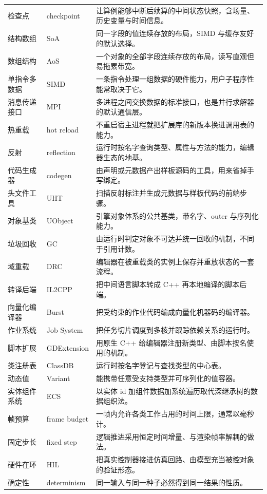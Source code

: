 \documentclass[12pt,a4paper,fontset=fandol]{ctexbook}
\newcommand{\Lang}[1]{\textsf{#1}}
\newcommand{\CPP}{\Lang{C++}}
\begin{document}
\begin{longtable}{>{\raggedright\arraybackslash}p{}>{\raggedright\arraybackslash}p{}>{\raggedright\arraybackslash}p{}}
检查点 & checkpoint & 让算例能够中断后续算的中间状态快照，含场量、历史变量与时间信息。 \\
结构数组 & SoA & 同一字段的值连续存放的布局，SIMD 与缓存友好的默认选择。 \\
数组结构 & AoS & 一个对象的全部字段连续存放的布局，读写直观但易拖累带宽。 \\
单指令多数据 & SIMD & 一条指令处理一组数据的硬件能力，用户子程序性能常取决于它。 \\
消息传递接口 & MPI & 多进程之间交换数据的标准接口，也是并行求解器的默认通信层。 \\
热重载 & hot reload & 不重启宿主进程就把扩展库的新版本换进调用表的能力。 \\
反射 & reflection & 运行时按名字查询类型、属性与方法的能力，编辑器生态的地基。 \\
代码生成器 & codegen & 由声明或元数据产出样板源码的工具，用来省掉手写绑定。 \\
头文件工具 & UHT & 扫描反射标注并生成元数据与样板代码的前端步骤。 \\
对象基类 & UObject & 引擎对象体系的公共基类，带名字、outer 与序列化能力。 \\
垃圾回收 & GC & 由运行时判定对象不可达并统一回收的机制，不同于引用计数。 \\
域重载 & DRC & 编辑器在被重载类的实例上保存并重放状态的一套流程。 \\
转译后端 & IL2CPP & 把中间语言脚本转成 \CPP{} 再本地编译的脚本后端。 \\
向量化编译器 & Burst & 把受约束的作业代码编成向量化机器码的编译器。 \\
作业系统 & Job System & 把任务切片调度到多核并跟踪依赖关系的运行时。 \\
脚本扩展 & GDExtension & 用原生 \CPP{} 给编辑器注册新类型、由脚本按名使用的机制。 \\
类注册表 & ClassDB & 运行时按名字登记与查找类型的中心表。 \\
动态值 & Variant & 能携带任意受支持类型并可序列化的值容器。 \\
实体组件系统 & ECS & 以实体 id 加组件数据加系统遍历取代深继承树的数据组织法。 \\
帧预算 & frame budget & 一帧内允许各类工作占用的时间上限，通常以毫秒计。 \\
固定步长 & fixed step & 逻辑推进采用恒定时间增量、与渲染帧率解耦的做法。 \\
硬件在环 & HIL & 把真实控制器接进仿真回路、由模型充当被控对象的验证形态。 \\
确定性 & determinism & 同一输入与同一种子必然得到同一结果的性质。 \\

\end{longtable}
\end{document}
